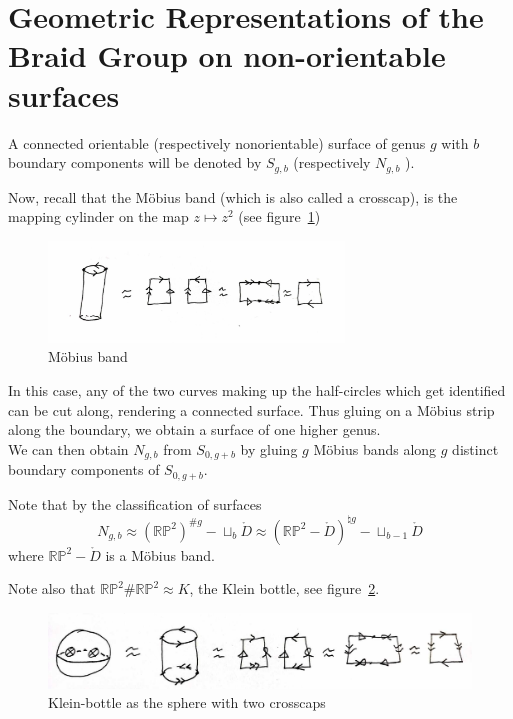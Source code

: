 \documentclass[reqno]{amsart}
\theoremstyle{definition}
\theoremstyle{remark}
\begin{document}
\newpage

\section{Geometric Representations of the Braid Group on
non-orientable surfaces}


A connected orientable (respectively nonorientable) surface
of genus $g$ with $b$ boundary components will
be denoted by $S_{g,b}$ (respectively $N_{g,b}$ ).

Now, recall that the Möbius band (which is also called
a crosscap), is the mapping cylinder on the map
$z \mapsto z^2$ (see figure~\ref{fig:mapping-cylinder-mobius})


\begin{figure}[htpb]
    \centering
    \includegraphics[width=0.7\textwidth]{mapping-cylinder-mobius.jpg}
    \caption{Möbius band}
    \label{fig:mapping-cylinder-mobius}
\end{figure}

In this case, any of the two curves making up the half-circles which
get identified can be cut along, rendering a connected surface.
Thus gluing on a Möbius strip along the boundary, we obtain a
surface of one higher genus.\\


We can then obtain $N_{g,b}$ from $S_{0,g+b}$ by
gluing $g$ Möbius bands along $g$ distinct boundary
components of $S_{0,g+b}$.

Note that by the classification of surfaces
\[
N_{g,b} \approx \left( \mathbb{R}\mathbb{P}^2 \right)^{\# g} -
\sqcup_{b} \mathring{D} \approx 
 \left(\mathbb{R}\mathbb{P}^2 - \mathring{D} 
\right)^{\natural g} - \sqcup_{b-1} \mathring{D}
\] 
where $\mathbb{R}\mathbb{P}^2 - \mathring{D}$ is a Möbius band.

Note also that $\mathbb{R}\mathbb{P}^2 \# \mathbb{R}\mathbb{P}^2
\approx K$, the Klein bottle,
see figure~\ref{fig:klein-bottle}.


\begin{figure}[H]
    \centering
    \includegraphics[width=1.2\textwidth]{klein-bottle.jpg}
    \caption{Klein-bottle as the sphere with two crosscaps}
    \label{fig:klein-bottle}
\end{figure}
\end{document}
